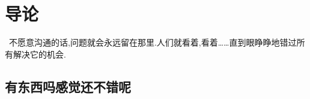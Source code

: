 \chapter{导论}
\begin{center}
\textcolor[RGB]{255, 0, 0}{\faHeart}~不愿意沟通的话,问题就会永远留在那里.人们就看着,看着……直到眼睁睁地错过所有解决它的机会.~\textcolor[RGB]{255, 0, 0}{\faHeart}
\end{center}
\begin{center}
\end{center}

\section{有东西吗感觉还不错呢}
